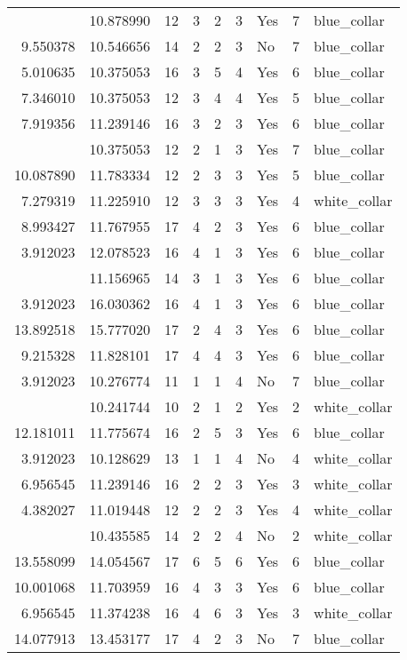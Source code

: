 \documentclass[
]{article}
\begin{document}
\begin{longtable}[t]{rrrrrllrl}
\addlinespace
7.346010 & 10.878990 & 12 & 3 & 2 & 3 & Yes & 7 & blue\_collar\\
9.550378 & 10.546656 & 14 & 2 & 2 & 3 & No & 7 & blue\_collar\\
5.010635 & 10.375053 & 16 & 3 & 5 & 4 & Yes & 6 & blue\_collar\\
7.346010 & 10.375053 & 12 & 3 & 4 & 4 & Yes & 5 & blue\_collar\\
7.919356 & 11.239146 & 16 & 3 & 2 & 3 & Yes & 6 & blue\_collar\\
\addlinespace
3.912023 & 10.375053 & 12 & 2 & 1 & 3 & Yes & 7 & blue\_collar\\
10.087890 & 11.783334 & 12 & 2 & 3 & 3 & Yes & 5 & blue\_collar\\
7.279319 & 11.225910 & 12 & 3 & 3 & 3 & Yes & 4 & white\_collar\\
8.993427 & 11.767955 & 17 & 4 & 2 & 3 & Yes & 6 & blue\_collar\\
3.912023 & 12.078523 & 16 & 4 & 1 & 3 & Yes & 6 & blue\_collar\\
\addlinespace
3.912023 & 11.156965 & 14 & 3 & 1 & 3 & Yes & 6 & blue\_collar\\
3.912023 & 16.030362 & 16 & 4 & 1 & 3 & Yes & 6 & blue\_collar\\
13.892518 & 15.777020 & 17 & 2 & 4 & 3 & Yes & 6 & blue\_collar\\
9.215328 & 11.828101 & 17 & 4 & 4 & 3 & Yes & 6 & blue\_collar\\
3.912023 & 10.276774 & 11 & 1 & 1 & 4 & No & 7 & blue\_collar\\
\addlinespace
3.912023 & 10.241744 & 10 & 2 & 1 & 2 & Yes & 2 & white\_collar\\
12.181011 & 11.775674 & 16 & 2 & 5 & 3 & Yes & 6 & blue\_collar\\
3.912023 & 10.128629 & 13 & 1 & 1 & 4 & No & 4 & white\_collar\\
6.956545 & 11.239146 & 16 & 2 & 2 & 3 & Yes & 3 & white\_collar\\
4.382027 & 11.019448 & 12 & 2 & 2 & 3 & Yes & 4 & white\_collar\\
\addlinespace
5.247024 & 10.435585 & 14 & 2 & 2 & 4 & No & 2 & white\_collar\\
13.558099 & 14.054567 & 17 & 6 & 5 & 6 & Yes & 6 & blue\_collar\\
10.001068 & 11.703959 & 16 & 4 & 3 & 3 & Yes & 6 & blue\_collar\\
6.956545 & 11.374238 & 16 & 4 & 6 & 3 & Yes & 3 & white\_collar\\
14.077913 & 13.453177 & 17 & 4 & 2 & 3 & No & 7 & blue\_collar\\

\end{longtable}
\end{document}
